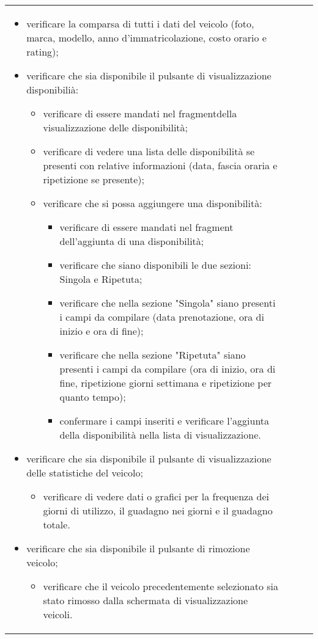 \begin{longtable}{ >{\centering}p{} >{\centering}p{} >{\centering}p{}
			>{\centering}p{}}
\begin{itemize}
		 	\item verificare la comparsa di tutti i dati del veicolo (foto, marca, modello, anno d'immatricolazione, costo orario e rating);
		 	\item verificare che sia disponibile il pulsante di visualizzazione disponibilià:
		 	\begin{itemize}
		 		\item verificare di essere mandati nel fragment\glosp della visualizzazione delle disponibilità;
		 		\item verificare di vedere una lista delle disponibilità se presenti con relative informazioni (data, fascia oraria e ripetizione se presente);
		 		\item verificare che si possa aggiungere una disponibilità:
		 		\begin{itemize}
		 			\item verificare di essere mandati nel fragment dell'aggiunta di una disponibilità;
		 			\item verificare che siano disponibili le due sezioni: Singola e Ripetuta;
		 			\item verificare che nella sezione "Singola" siano presenti i campi da compilare (data prenotazione, ora di inizio e ora di fine);
		 			\item verificare che nella sezione "Ripetuta" siano presenti i campi da compilare (ora di inizio, ora di fine, ripetizione giorni settimana e ripetizione per quanto tempo);
		 			\item confermare i campi inseriti e verificare l'aggiunta della disponibilità nella lista di visualizzazione.
		 		\end{itemize}
		 	\end{itemize}
	 		\item verificare che sia disponibile il pulsante di visualizzazione delle statistiche del veicolo;
	 		\begin{itemize}
	 			\item verificare di vedere dati o grafici per la frequenza dei giorni di utilizzo, il guadagno nei giorni e il guadagno totale.
	 		\end{itemize}
		 	\item verificare che sia disponibile il pulsante di rimozione veicolo;
		 	\begin{itemize}
		 		\item verificare che il veicolo precedentemente selezionato sia stato rimosso dalla schermata di visualizzazione veicoli.
		 	\end{itemize}

\end{itemize}
\end{longtable}

